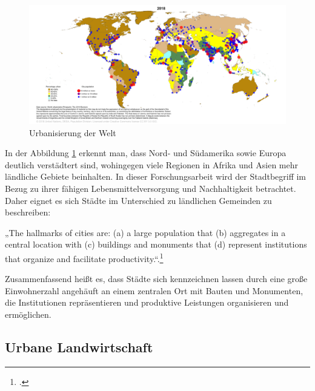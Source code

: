 \documentclass{scrartcl}
\begin{document}
\begin{figure}[htbp]
\centering
\hspace*{-3cm}   
\includegraphics[width=20cm]{image_folder/CityPop_Urban.png}
\caption{Urbanisierung der Welt}
\label{figUrban}
\end{figure}

\FloatBarrier
In der Abbildung \ref{figUrban} erkennt man, dass Nord- und Südamerika sowie Europa deutlich verstädtert sind, wohingegen viele Regionen in Afrika und Asien mehr ländliche Gebiete beinhalten. In dieser Forschungsarbeit wird der Stadtbegriff im Bezug zu ihrer fähigen Lebensmittelversorgung und Nachhaltigkeit betrachtet. Daher eignet es sich Städte im Unterschied zu ländlichen Gemeinden zu beschreiben: 

\begin{displayquote} 
„The hallmarks of cities are: (a) a large population that (b) aggregates in a central location with (c) buildings and monuments that (d) represent institutions that organize and facilitate productivity.“.\footcite[S.16]{Elmqvist2013} 
\end{displayquote}  
Zusammenfassend heißt es, dass Städte sich kennzeichnen lassen durch eine große Einwohnerzahl angehäuft an einem zentralen Ort mit Bauten und Monumenten, die Institutionen repräsentieren und produktive Leistungen organisieren und ermöglichen.

\subsection{Urbane Landwirtschaft}
\end{document}
